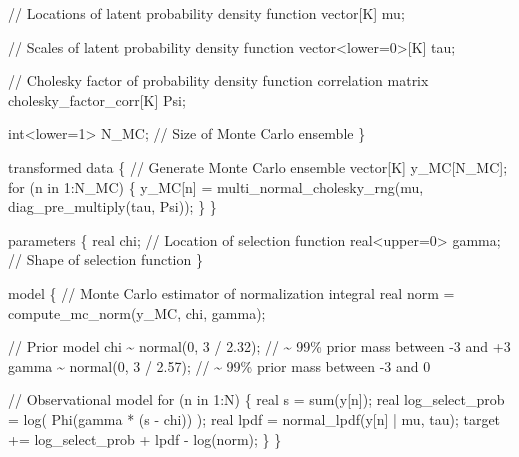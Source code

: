 \documentclass[
  letterpaper,
  DIV=11,
  numbers=noendperiod]{scrartcl}
\newenvironment{Shaded}{\begin{snugshade}}{\end{snugshade}}
\newcommand{\CommentTok}[1]{\textcolor[rgb]{0.37,0.37,0.37}{#1}}
\newcommand{\ControlFlowTok}[1]{\textcolor[rgb]{0.00,0.23,0.31}{#1}}
\newcommand{\DataTypeTok}[1]{\textcolor[rgb]{0.68,0.00,0.00}{#1}}
\newcommand{\DecValTok}[1]{\textcolor[rgb]{0.68,0.00,0.00}{#1}}
\newcommand{\FloatTok}[1]{\textcolor[rgb]{0.68,0.00,0.00}{#1}}
\newcommand{\KeywordTok}[1]{\textcolor[rgb]{0.00,0.23,0.31}{#1}}
\newcommand{\NormalTok}[1]{\textcolor[rgb]{0.00,0.23,0.31}{#1}}
\begin{document}
\begin{codelisting}
\begin{Shaded}
\begin{Highlighting}[]
  \CommentTok{// Locations of latent probability density function}
  \DataTypeTok{vector}\NormalTok{[K] mu;}

  \CommentTok{// Scales of latent probability density function}
  \DataTypeTok{vector}\NormalTok{\textless{}}\KeywordTok{lower}\NormalTok{=}\DecValTok{0}\NormalTok{\textgreater{}[K] tau;}

  \CommentTok{// Cholesky factor of probability density function correlation matrix}
  \DataTypeTok{cholesky\_factor\_corr}\NormalTok{[K] Psi;}

  \DataTypeTok{int}\NormalTok{\textless{}}\KeywordTok{lower}\NormalTok{=}\DecValTok{1}\NormalTok{\textgreater{} N\_MC; }\CommentTok{// Size of Monte Carlo ensemble}
\NormalTok{\}}

\KeywordTok{transformed data}\NormalTok{ \{}
  \CommentTok{// Generate Monte Carlo ensemble}
  \DataTypeTok{vector}\NormalTok{[K] y\_MC[N\_MC];}
  \ControlFlowTok{for}\NormalTok{ (n }\ControlFlowTok{in} \DecValTok{1}\NormalTok{:N\_MC) \{}
\NormalTok{    y\_MC[n] = multi\_normal\_cholesky\_rng(mu, diag\_pre\_multiply(tau, Psi));}
\NormalTok{  \}}
\NormalTok{\}}

\KeywordTok{parameters}\NormalTok{ \{}
  \DataTypeTok{real}\NormalTok{ chi;            }\CommentTok{// Location of selection function}
  \DataTypeTok{real}\NormalTok{\textless{}}\KeywordTok{upper}\NormalTok{=}\DecValTok{0}\NormalTok{\textgreater{} gamma; }\CommentTok{// Shape of selection function}
\NormalTok{\}}

\KeywordTok{model}\NormalTok{ \{}
  \CommentTok{// Monte Carlo estimator of normalization integral}
  \DataTypeTok{real}\NormalTok{ norm = compute\_mc\_norm(y\_MC, chi, gamma);}
  
  \CommentTok{// Prior model}
\NormalTok{  chi \textasciitilde{} normal(}\DecValTok{0}\NormalTok{, }\DecValTok{3}\NormalTok{ / }\FloatTok{2.32}\NormalTok{);   }\CommentTok{// \textasciitilde{} 99\% prior mass between {-}3 and +3}
\NormalTok{  gamma \textasciitilde{} normal(}\DecValTok{0}\NormalTok{, }\DecValTok{3}\NormalTok{ / }\FloatTok{2.57}\NormalTok{); }\CommentTok{// \textasciitilde{} 99\% prior mass between {-}3 and  0}
  
  \CommentTok{// Observational model}
  \ControlFlowTok{for}\NormalTok{ (n }\ControlFlowTok{in} \DecValTok{1}\NormalTok{:N) \{}
    \DataTypeTok{real}\NormalTok{ s = sum(y[n]);}
    \DataTypeTok{real}\NormalTok{ log\_select\_prob = log( Phi(gamma * (s {-} chi)) );}
    \DataTypeTok{real}\NormalTok{ lpdf = normal\_lpdf(y[n] | mu, tau);}
    \KeywordTok{target +=}\NormalTok{ log\_select\_prob + lpdf {-} log(norm);}
\NormalTok{  \}}
\NormalTok{\}}


\end{Highlighting}
\end{Shaded}
\end{codelisting}
\end{document}
